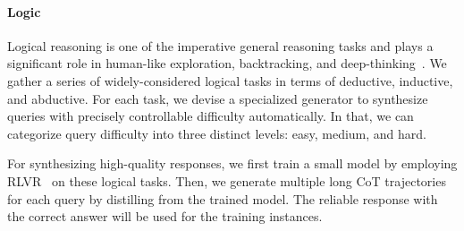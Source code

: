 \noindent\paragraph{Logic}
Logical reasoning
is one of the imperative general reasoning tasks and plays a significant role in human-like exploration, backtracking, and deep-thinking~\citep{yu2024natural, Jiang2025Do}. 
We gather a series of widely-considered logical tasks in terms of deductive, inductive, and abductive. 
For each task, we devise a specialized generator to synthesize queries with precisely controllable difficulty automatically. 
In that, we can categorize query difficulty into three distinct levels: easy, medium, and hard.

For synthesizing high-quality responses,
we first train a small model by employing RLVR~\citep{lambert2024tulu} on these logical tasks. 
Then, we generate multiple long CoT trajectories for each query by distilling from the trained model.
The reliable response with the correct answer will be used for the training instances.


